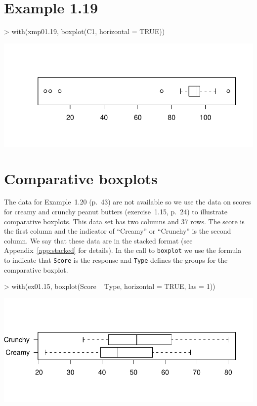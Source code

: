 \documentclass{book}
\begin{document}
\section{Example 1.19}
\label{sec:xmp01.19}
\begin{center}
\begin{Schunk}
\begin{Sinput}
> with(xmp01.19, boxplot(C1, horizontal = TRUE))
\end{Sinput}
\end{Schunk}
\includegraphics{Devore6-xmp0119}
\end{center}


\section{Comparative boxplots}
\label{sec:xmp0120}

The data for Example~1.20 (p.~43) are not available so we use the data
on scores for creamy and crunchy peanut butters (exercise~1.15, p.~24)
to illustrate comparative boxplots.  This data set has two columns and
37 rows.  The score is the first column and the indicator of
``Creamy'' or ``Crunchy'' is the second column.  We say that these
data are in the stacked format (see Appendix~\ref{app:stacked} for
details).  In the call to \texttt{boxplot} we use the formula
~ to indicate that \texttt{Score} is the response
and \texttt{Type} defines the groups for the comparative boxplot.
\begin{center}
\begin{Schunk}
\begin{Sinput}
> with(ex01.15, boxplot(Score ~ Type, horizontal = TRUE, las = 1))
\end{Sinput}
\end{Schunk}
\includegraphics{Devore6-xmp0120}
\end{center}
\end{document}
